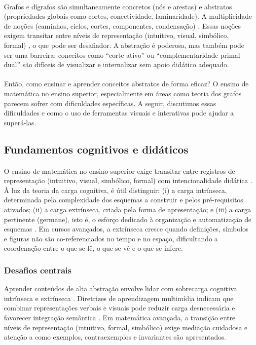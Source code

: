 \documentclass[12pt,a4paper]{article}
\def\emph#1{#1}%
\begin{document}
\paragraph{}
Grafos e dígrafos são simultaneamente concretos (nós e arestas) e abstratos (propriedades globais como cortes, conectividade, laminaridade). A multiplicidade de noções (caminhos, ciclos, cortes, componentes, condensação) \cite{bondy2008graph,diestel2017graph,west2001introduction}. Essas noções exigem transitar entre níveis de representação (intuitivo, visual, simbólico, formal) \cite{tall1991advanced}, o que pode ser desafiador. A abstração é poderosa, mas também pode ser uma barreira: conceitos como “corte ativo” ou “complementaridade primal–dual” são difíceis de visualizar e internalizar sem apoio didático adequado.

\paragraph{}
Então, como ensinar e aprender conceitos abstratos de forma eficaz? O ensino de matemática no ensino superior, especialmente em áreas como teoria dos grafos parecem sofrer com dificuldades específicas. A seguir, discutimos essas dificuldades e como o uso de ferramentas visuais e interativas pode ajudar a superá-las.

\subsection{Fundamentos cognitivos e didáticos}
\paragraph{}
O ensino de matemática no ensino superior exige transitar entre registros de representação (intuitivo, visual, simbólico, formal) com intencionalidade didática \cite{tall1991advanced}. À luz da teoria da carga cognitiva, é útil distinguir: (i) a \emph{carga intrínseca}, determinada pela complexidade dos esquemas a construir e pelos pré-requisitos ativados; (ii) a \emph{carga extrínseca}, criada pela forma de apresentação; e (iii) a \emph{carga pertinente} (\emph{germane}), isto é, o esforço dedicado à organização e automatização de esquemas \cite{sweller1988cognitive}. Em cursos avançados, a extrínseca cresce quando definições, símbolos e figuras não são co-referenciados no tempo e no espaço, dificultando a coordenação entre o que se lê, o que se vê e o que se infere.

\subsubsection{Desafios centrais}
Aprender conteúdos de alta abstração envolve lidar com sobrecarga cognitiva intrínseca e extrínseca \cite{sweller1988cognitive}. Diretrizes de aprendizagem multimídia indicam que combinar representações verbais e visuais pode reduzir carga desnecessária e favorecer integração semântica \cite{mayer2009multimedia,paivio1990}. Em matemática avançada, a transição entre níveis de representação (intuitivo, formal, simbólico) exige mediação cuidadosa \cite{tall1991advanced} e atenção a como exemplos, contraexemplos e invariantes são apresentados.
\end{document}
